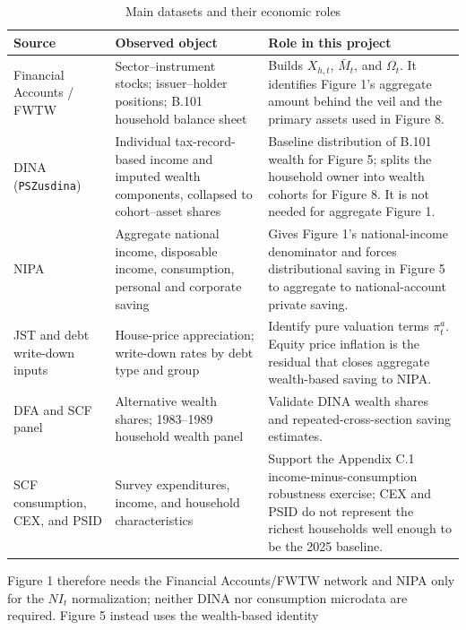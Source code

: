 \documentclass[11pt]{article}
\newcommand{\matM}{\bar M}
\newcommand{\code}[1]{\texttt{#1}}
\begin{document}
\begin{table}[htbp]
  \centering
  \caption{Main datasets and their economic roles}
  \label{tab:main-data-roles}
  \small
  \begin{tabular}{@{}
    >{\raggedright\arraybackslash}p{}
    >{\raggedright\arraybackslash}p{}
    >{\raggedright\arraybackslash}p{}@{}}
    \toprule
    \textbf{Source} & \textbf{Observed object} & \textbf{Role in this project} \\
    \midrule
    Financial Accounts / FWTW
      & Sector--instrument stocks; issuer--holder positions; B.101 household
        balance sheet
      & Builds \(X_{h,t}\), \(\matM_t\), and \(\Omega_t\).  It identifies
        Figure 1's aggregate amount behind the veil and the primary assets
        used in Figure 8. \\
    DINA (\code{PSZusdina})
      & Individual tax-record-based income and imputed wealth components,
        collapsed to cohort--asset shares
      & Baseline distribution of B.101 wealth for Figure 5; splits the
        household owner into wealth cohorts for Figure 8.  It is not needed
        for aggregate Figure 1. \\
    NIPA
      & Aggregate national income, disposable income, consumption, personal
        and corporate saving
      & Gives Figure 1's national-income denominator and forces
        distributional saving in Figure 5 to aggregate to national-account
        private saving. \\
    JST and debt write-down inputs
      & House-price appreciation; write-down rates by debt type and group
      & Identify pure valuation terms \(\pi^a_t\).  Equity price inflation is
        the residual that closes aggregate wealth-based saving to NIPA. \\
    DFA and SCF panel
      & Alternative wealth shares; 1983--1989 household wealth panel
      & Validate DINA wealth shares and repeated-cross-section saving
        estimates. \\
    SCF consumption, CEX, and PSID
      & Survey expenditures, income, and household characteristics
      & Support the Appendix C.1 income-minus-consumption robustness exercise;
        CEX and PSID do not represent the richest households well enough to be
        the 2025 baseline. \\
    \bottomrule
  \end{tabular}
\end{table}

Figure 1 therefore needs the Financial Accounts/FWTW network and NIPA only for
the \(NI_t\) normalization; neither DINA nor consumption microdata are required.
Figure 5 instead uses the wealth-based identity
\end{document}
